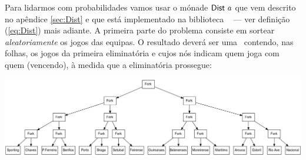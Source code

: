 \documentclass[a4paper]{article}
\newcommand{\Varid}[1]{\mathit{#1}}
\begin{document}
Para lidarmos com probabilidades vamos usar o mónade \ensuremath{\fun{Dist}\;\Varid{a}} que vem descrito no apêndice
\ref{sec:Dist} e que está implementado na biblioteca \Probability\ \cite{EK06}
--- ver definição (\ref{eq:Dist}) mais adiante.
A primeira parte do problema consiste em sortear \emph{aleatoriamente} os jogos das equipas.
O resultado deverá ser uma \LTree\ contendo, nas folhas, os jogos da primeira eliminatória
e cujos nós indicam quem joga com quem (vencendo), à medida que a eliminatória prossegue:
\begin{center}
       \includegraphics[width=1.00\textwidth]{cp1617t_media/sorteio.jpg}
\end{center}
\end{document}
